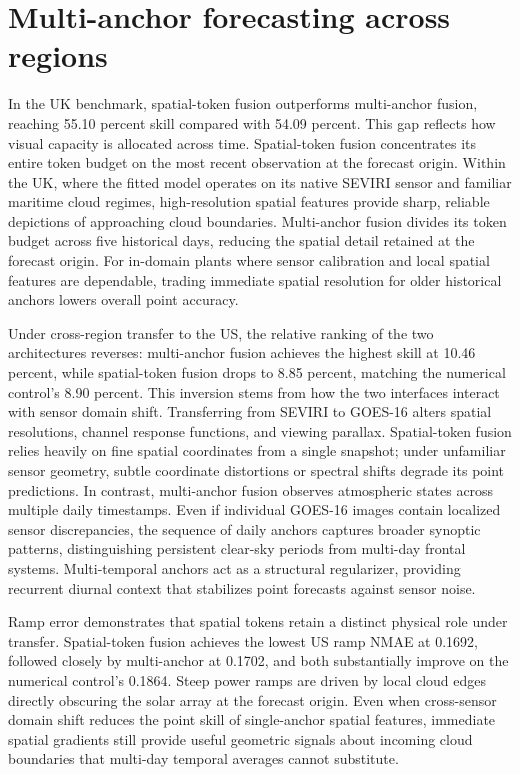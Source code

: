 \section{Multi-anchor forecasting across regions}

In the UK benchmark, spatial-token fusion outperforms multi-anchor fusion, reaching 55.10 percent skill compared with 54.09 percent. This gap reflects how visual capacity is allocated across time. Spatial-token fusion concentrates its entire token budget on the most recent observation at the forecast origin. Within the UK, where the fitted model operates on its native SEVIRI sensor and familiar maritime cloud regimes, high-resolution spatial features provide sharp, reliable depictions of approaching cloud boundaries. Multi-anchor fusion divides its token budget across five historical days, reducing the spatial detail retained at the forecast origin. For in-domain plants where sensor calibration and local spatial features are dependable, trading immediate spatial resolution for older historical anchors lowers overall point accuracy.

Under cross-region transfer to the US, the relative ranking of the two architectures reverses: multi-anchor fusion achieves the highest skill at 10.46 percent, while spatial-token fusion drops to 8.85 percent, matching the numerical control's 8.90 percent. This inversion stems from how the two interfaces interact with sensor domain shift. Transferring from SEVIRI to GOES-16 alters spatial resolutions, channel response functions, and viewing parallax. Spatial-token fusion relies heavily on fine spatial coordinates from a single snapshot; under unfamiliar sensor geometry, subtle coordinate distortions or spectral shifts degrade its point predictions. In contrast, multi-anchor fusion observes atmospheric states across multiple daily timestamps. Even if individual GOES-16 images contain localized sensor discrepancies, the sequence of daily anchors captures broader synoptic patterns, distinguishing persistent clear-sky periods from multi-day frontal systems. Multi-temporal anchors act as a structural regularizer, providing recurrent diurnal context that stabilizes point forecasts against sensor noise.

Ramp error demonstrates that spatial tokens retain a distinct physical role under transfer. Spatial-token fusion achieves the lowest US ramp NMAE at 0.1692, followed closely by multi-anchor at 0.1702, and both substantially improve on the numerical control's 0.1864. Steep power ramps are driven by local cloud edges directly obscuring the solar array at the forecast origin. Even when cross-sensor domain shift reduces the point skill of single-anchor spatial features, immediate spatial gradients still provide useful geometric signals about incoming cloud boundaries that multi-day temporal averages cannot substitute.

